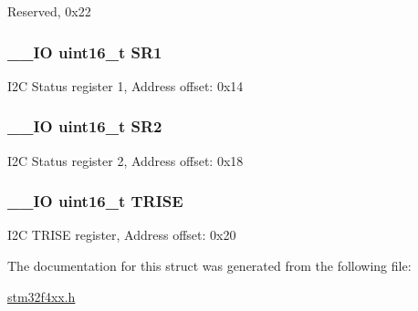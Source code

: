 Reserved, 0x22 \hypertarget{struct_i2_c___type_def_a1e79a16729e8d1032d9fe552d50dce41}{
\subsubsection[{S\-R1}]{\setlength{\rightskip}{0pt plus 5cm}\-\_\-\-\_\-\-I\-O uint16\-\_\-t S\-R1}}\label{struct_i2_c___type_def_a1e79a16729e8d1032d9fe552d50dce41}
I2\-C Status register 1, Address offset\-: 0x14 \hypertarget{struct_i2_c___type_def_a682809d3f8187cdefb9d615e89b67e65}{
\subsubsection[{S\-R2}]{\setlength{\rightskip}{0pt plus 5cm}\-\_\-\-\_\-\-I\-O uint16\-\_\-t S\-R2}}\label{struct_i2_c___type_def_a682809d3f8187cdefb9d615e89b67e65}
I2\-C Status register 2, Address offset\-: 0x18 \hypertarget{struct_i2_c___type_def_a7fbb70132ee565bb179078b6ee20cc2b}{
\subsubsection[{T\-R\-I\-S\-E}]{\setlength{\rightskip}{0pt plus 5cm}\-\_\-\-\_\-\-I\-O uint16\-\_\-t T\-R\-I\-S\-E}}\label{struct_i2_c___type_def_a7fbb70132ee565bb179078b6ee20cc2b}
I2\-C T\-R\-I\-S\-E register, Address offset\-: 0x20 

The documentation for this struct was generated from the following file\-:\begin{DoxyCompactItemize}
\item 
\hyperlink{stm32f4xx_8h}{stm32f4xx.\-h}\end{DoxyCompactItemize}
